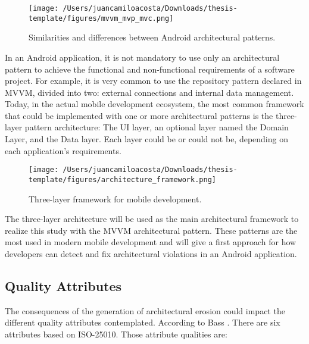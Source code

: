 \begin{figure}
    \centering
    \texttt{[image: /Users/juancamiloacosta/Downloads/thesis-template/figures/mvvm\_mvp\_mvc.png]}
    \caption{Similarities and differences between Android architectural patterns. \citet{} }
    \label{fig:concept-map}
\end{figure}


In an Android application, it is not mandatory to use only an architectural pattern to achieve the functional and non-functional requirements of a software project. For example, it is very common to use the repository pattern declared in MVVM, divided into two: external connections and internal data management. Today, in the actual mobile development ecosystem, the most common framework that could be implemented with one or more architectural patterns is the three-layer pattern architecture: The UI layer, an optional layer named the Domain Layer, and the Data layer. Each layer could be or could not be, depending on each application's requirements. 

\begin{figure}
    \centering
    \texttt{[image: /Users/juancamiloacosta/Downloads/thesis-template/figures/architecture\_framework.png]}
    \caption{Three-layer framework for mobile development. \citet{} }
    \label{fig:concept-map}
\end{figure}

The three-layer architecture will be used as the main architectural framework to realize this study with the MVVM architectural pattern. These patterns are the most used in modern mobile development and will give a first approach for how developers can detect and fix architectural violations in an Android application.

\subsection{Quality Attributes}
The consequences of the generation of architectural erosion could impact the different quality attributes contemplated. According to Bass \citet{bass-architecture-book}. There are six attributes based on ISO-25010. Those attribute qualities are:

